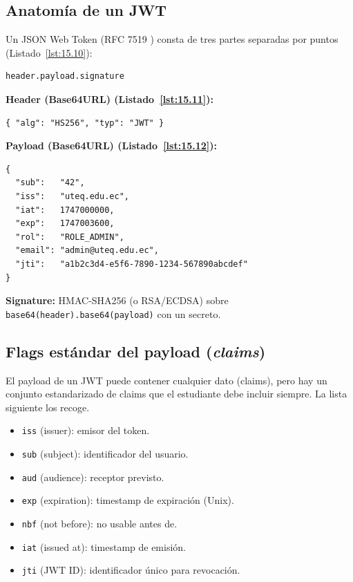\subsection{Anatomía de un JWT}

Un JSON Web Token (RFC 7519 \cite{jones2015jwt}) consta de tres
partes separadas por puntos (Listado~\ref{lst:15.10}):

\begin{lstlisting}[style=shell,numbers=none,caption={Ejemplo de Shell},label=lst:15.10]
header.payload.signature
\end{lstlisting}

\textbf{Header (Base64URL) (Listado~\ref{lst:15.11}):}
\begin{lstlisting}[style=js,numbers=none,caption={Ejemplo de JavaScript},label=lst:15.11]
{ "alg": "HS256", "typ": "JWT" }
\end{lstlisting}

\textbf{Payload (Base64URL) (Listado~\ref{lst:15.12}):}
\begin{lstlisting}[style=js,numbers=none,caption={Ejemplo de JavaScript},label=lst:15.12]
{
  "sub":   "42",
  "iss":   "uteq.edu.ec",
  "iat":   1747000000,
  "exp":   1747003600,
  "rol":   "ROLE_ADMIN",
  "email": "admin@uteq.edu.ec",
  "jti":   "a1b2c3d4-e5f6-7890-1234-567890abcdef"
}
\end{lstlisting}

\textbf{Signature:} HMAC-SHA256 (o RSA/ECDSA) sobre
\texttt{base64(header).base64(payload)} con un secreto.

\subsection{Flags estándar del payload (\emph{claims})}

El payload de un JWT puede contener cualquier dato (claims),
pero hay un conjunto estandarizado de claims que el estudiante debe
incluir siempre. La lista siguiente los recoge.


\begin{itemize}
\item \texttt{iss} (issuer): emisor del token.
\item \texttt{sub} (subject): identificador del usuario.
\item \texttt{aud} (audience): receptor previsto.
\item \texttt{exp} (expiration): timestamp de expiración (Unix).
\item \texttt{nbf} (not before): no usable antes de.
\item \texttt{iat} (issued at): timestamp de emisión.
\item \texttt{jti} (JWT ID): identificador único para revocación.
\end{itemize}


